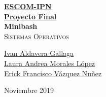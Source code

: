 \documentclass[12pt, fleqn]{article}                             %
\author{Laura Andrea}              %
\theoremstyle{break}                                            %
\begin{document}
\begin{titlepage}
    
    \pagecolor{tealgreen}                                      %
    \color{white}                                                   %

    \vspace                                                         %
    \baselineskip                                                   %

    \makebox[0pt][l]{\rule{1.3\textwidth}{3pt}}                     %
    
    \href{https://compilandoconocimiento.com}                       %
    {\textbf{\textsc{\Huge ESCOM-IPN}}}\\[2.7cm]                    %

    \href{https://github.com/Ivan0123456789/ProyectoSO}                       %
    {\fontsize{36}{50}                                              %
        \selectfont \textbf{Proyecto Final}}\\[0.5cm]       %
    {\fontsize{36}{50}                                              %
        \selectfont \textbf{Minibash}}\\[0.5cm]                %
    \textcolor{BlueGrey100MD}                                        %
        {\textsc{\LARGE Sistemas Operativos}}     %
    
    \vfill                                                          %
    
    \href{https://compilandoconocimiento.com/}                    %
    {\LARGE \textsf{Ivan Aldavera Gallaga}\\
    \LARGE \textsf{Laura Andrea Morales López}\\
    \LARGE \textsf{Erick Francisco Vázquez Nuñez}}   %

    \vspace                                                         %
    \baselineskip                                                   %
    
    {\large \textsf{Noviembre 2019}}                                  %

   

\end{titlepage}
\end{document}
